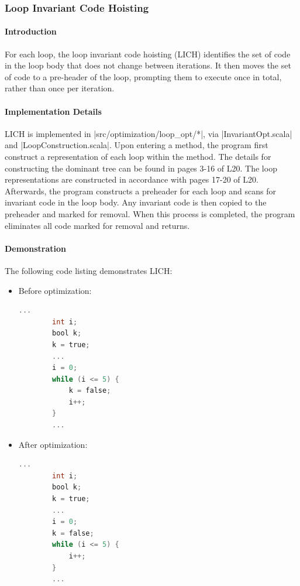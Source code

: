 \subsubsection{Loop Invariant Code Hoisting}

\paragraph{Introduction}

For each loop, the loop invariant code hoisting (LICH) identifies the set of code in the loop body that does not change between iterations. It then moves the set of code to a pre-header of the loop, prompting them to execute once in total, rather than once per iteration.

\paragraph{Implementation Details}

LICH is implemented in |src/optimization/loop_opt/*|, via |InvariantOpt.scala| and |LoopConstruction.scala|. Upon entering a method, the program first construct a representation of each loop within the method. The details for constructing the dominant tree can be found in pages 3-16 of L20. The loop representations are constructed in accordance with pages 17-20 of L20. Afterwards, the program constructs a preheader for each loop and scans for invariant code in the loop body. Any invariant code is then copied to the preheader and marked for removal. When this process is completed, the program eliminates all code marked for removal and returns.

\paragraph{Demonstration}

The following code listing demonstrates LICH:

\begin{itemize}
    \item Before optimization:
    \begin{lstlisting}[language=C]
        ...
        int i;
        bool k;
        k = true;
        ...
        i = 0;
        while (i <= 5) {
            k = false;
            i++;
        }
        ...
    \end{lstlisting}
    \item After optimization:
    \begin{lstlisting}[language=C]
        ...
        int i;
        bool k;
        k = true;
        ...
        i = 0;
        k = false;
        while (i <= 5) {
            i++;
        }
        ...
    \end{lstlisting}
\end{itemize}

